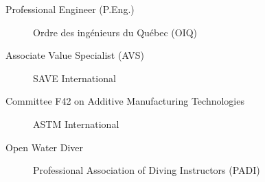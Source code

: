 \begin{description}
\item[Professional Engineer (P.Eng.)] Ordre des ingénieurs du Québec (OIQ)
\item[Associate Value Specialist (AVS)] SAVE International
\item[Committee F42 on Additive Manufacturing Technologies] ASTM International
\item[Open Water Diver] Professional Association of Diving Instructors (PADI)
\end{description}
